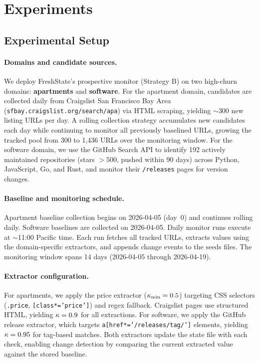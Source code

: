 \section{Experiments}
\label{sec:experiments}

\subsection{Experimental Setup}

\paragraph{Domains and candidate sources.}
We deploy FreshState's prospective monitor (Strategy B) on two high-churn domains:
\textbf{apartments} and \textbf{software}. For the apartment domain, candidates are
collected daily from Craigslist San Francisco Bay Area
(\texttt{sfbay.craigslist.org/search/apa}) via HTML scraping, yielding ${\sim}300$
new listing URLs per day. A rolling collection strategy accumulates new candidates
each day while continuing to monitor all previously baselined URLs, growing the
tracked pool from 300 to 1,436 URLs over the monitoring window.
For the software domain, we use the GitHub Search API to identify 192 actively
maintained repositories (stars $> 500$, pushed within 90 days) across Python,
JavaScript, Go, and Rust, and monitor their \texttt{/releases} pages for version
changes.

\paragraph{Baseline and monitoring schedule.}
Apartment baseline collection begins on 2026-04-05 (day~0) and continues rolling
daily. Software baselines are collected on 2026-04-05. Daily monitor runs execute
at ${\sim}$11:00 Pacific time. Each run fetches all tracked URLs, extracts values
using the domain-specific extractors, and appends change events to the seeds files.
The monitoring window spans 14 days (2026-04-05 through 2026-04-19).

\paragraph{Extractor configuration.}
For apartments, we apply the price extractor ($\kappa_{\min} = 0.5$) targeting
CSS selectors (\texttt{.price}, \texttt{[class*='price']}) and regex fallback.
Craigslist pages use structured HTML, yielding $\kappa = 0.9$ for all extractions.
For software, we apply the GitHub release extractor, which targets
\texttt{a[href*='/releases/tag/']} elements, yielding $\kappa = 0.95$ for tag-based
matches. Both extractors update the state file with each check, enabling
change detection by comparing the current extracted value against the stored baseline.

